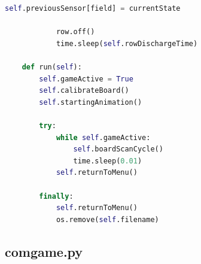 \begin{scriptsize}
\begin{lstlisting}[style=Python, language=Python, captionpos=b, stepnumber=5, caption={multigame.py}, label={lst:multigame}]
                self.previousSensor[field] = currentState

            row.off()
            time.sleep(self.rowDischargeTime)
            
    def run(self):
        self.gameActive = True
        self.calibrateBoard()
        self.startingAnimation()

        try:
            while self.gameActive:
                self.boardScanCycle()
                time.sleep(0.01)
            self.returnToMenu()

        finally:
            self.returnToMenu()
            os.remove(self.filename)

\end{lstlisting}
\end{scriptsize}

\subsection{comgame.py}
